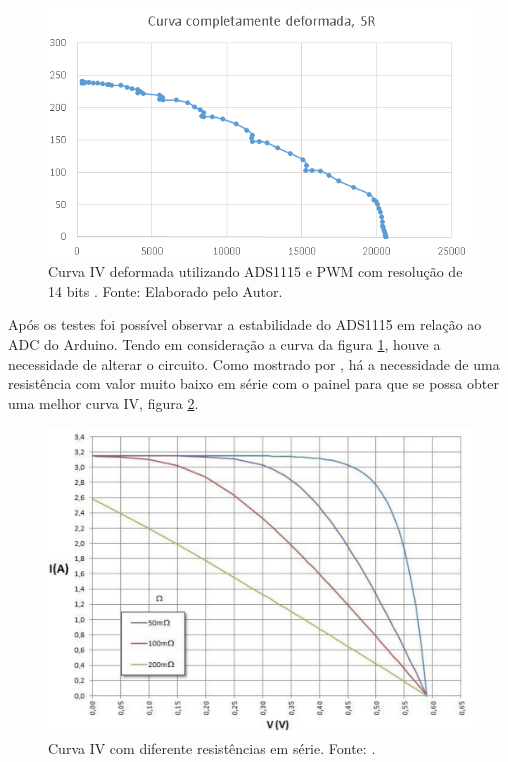 \FloatBarrier
\begin{figure}[!htbp]
	\centering
	\includegraphics[scale=0.85]{imagens/CurvaIVdeformadaII}
	\caption{Curva IV deformada utilizando ADS1115 e  PWM com resolução de 14 bits . Fonte: Elaborado pelo Autor. 	}
	\label{fig:CurvaIVdeformadaII}
\end{figure}
\FloatBarrier

Após os testes foi possível observar a estabilidade do ADS1115 em relação ao ADC do Arduino. Tendo em consideração a curva da figura \ref{fig:CurvaIVdeformadaII}, houve a necessidade de alterar o circuito. Como mostrado por , há a necessidade de uma resistência com valor muito baixo em série com o painel para que se possa obter uma melhor curva IV, figura \ref{fig:CurvaResistencia}.
\FloatBarrier
\begin{figure}[!htbp]
	\centering
	\includegraphics[scale=0.4]{imagens/CurvaResistencia}
	\caption{Curva IV com diferente resistências em série. Fonte: \cite{de2004manual}. 	}
	\label{fig:CurvaResistencia}
\end{figure}
\FloatBarrier

